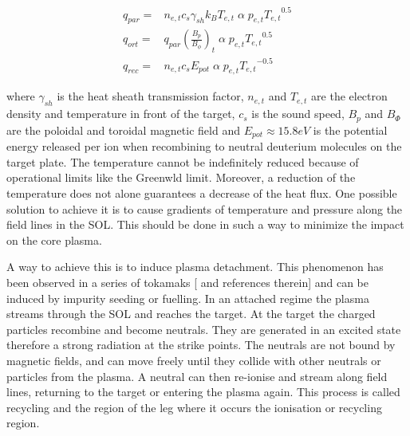 \begin{equation}
\begin{aligned}
{ q } _{ par } =& { n } _{ e,t } { c } _{ s } {  \gamma  } _{ sh }{ k } _{ B }{ T } _{ e,t } \; \alpha \; { p } _{ e,t }{{ T } _{ e,t }}^{0.5 } \\
{ q } _{ ort } =& { q } _{ par } \left( \frac {{ B } _{ p }} {{  B  }_{ \phi  }}   \right) _{ t} \; \alpha \; { p } _{ e,t }{{ T } _{ e,t }}^{0.5 } \\
{ q } _{ rec } =& { n } _{ e,t } { c } _{ s } {  E  } _{ pot } \; \alpha \; { p } _{ e,t }{{ T } _{ e,t }}^{-0.5 }
\end{aligned}
\label{eq:detachment}
\end{equation}

where $\gamma_{sh}$ is the heat sheath transmission factor, $n_{e,t}$ and $T_{e,t}$ are the electron density and temperature in front of the target, $c_s$ is the sound speed, $B_p$ and $B_{\Phi}$ are the poloidal and toroidal magnetic field and $E_{pot} \approx 15.8 eV$ is the potential energy released per ion when recombining to neutral deuterium molecules on the target plate. \cite{Reimold2015} The temperature cannot be indefinitely reduced because of operational limits like the Greenwld limit.\cite{Greenwald1988} Moreover, a reduction of the temperature does not alone guarantees a decrease of the heat flux.  One possible solution to achieve it is to cause gradients of temperature and pressure along the field lines in the SOL. This should be done in such a way to minimize the impact on the core plasma.

A way to achieve this is to induce plasma detachment. This phenomenon has been observed in a series of tokamaks [\cite{Reimold2015} and references therein] and can be induced by impurity seeding or fuelling.
In an attached regime the plasma streams through the SOL and reaches the target. At the target the charged particles recombine and become neutrals. They are generated in an excited state therefore a strong radiation at the strike points. The neutrals are not bound by magnetic fields, and can move freely until they collide with other neutrals or particles from the plasma. A neutral can then re-ionise and stream along field lines, returning to the target or entering the plasma again. This process is called recycling and the region of the leg where it occurs the ionisation or recycling region.


